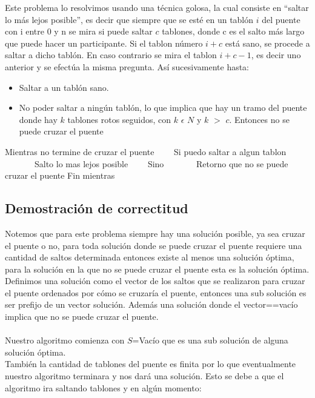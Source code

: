 Este problema lo resolvimos usando una técnica golosa, la cual consiste en “saltar lo más lejos posible”, es decir que siempre que se esté en un tablón $i$ del puente con i entre 0 y n se mira si puede saltar $c$ tablones, donde c es el salto más largo que puede hacer un participante. Si el tablon número $i + c$ está sano, se procede a saltar a dicho tablón. En caso contrario se mira el tablon $i + c - 1$, es decir uno anterior y se efectúa la misma pregunta. Así sucesivamente hasta:

\begin{itemize}
	\item Saltar a un tablón sano.
	\item No poder saltar a ningún tablón, lo que implica que hay un tramo del puente donde hay $k$ tablones rotos seguidos, con $k$  $\epsilon$ $N$ y $k$ $>$ $c$. Entonces no se puede cruzar el puente
\end{itemize}

\begin{codebox}
\li Mientras no termine de cruzar el puente
\li \ \ \ \ Si puedo saltar a algun tablon
\li \ \ \ \ \ \ \ Salto lo mas lejos posible
\li \ \ \ \ Sino
\li \ \ \ \ \ \ \ Retorno que no se puede cruzar el puente
\li Fin mientras 
\end{codebox}




\subsection{Demostraci\'on de correctitud} 

Notemos que para este problema siempre hay una solución posible, ya sea cruzar el puente o no, para toda solución donde se puede cruzar el puente requiere una cantidad de saltos determinada entonces existe al menos una solución óptima, para la solución en la que no se puede cruzar el puente esta es la solución óptima. \\
Definimos  una solución como el vector de los saltos que se realizaron para cruzar el puente ordenados por cómo se cruzaría el puente, entonces una sub solución es ser prefijo de un vector solución. Además una solución donde el vector==vacío implica que no se puede cruzar el puente. \\ \\

Nuestro algoritmo comienza con $S$=Vacío que es una sub solución de alguna solución óptima. \\
También la cantidad de tablones del puente es finita por lo que eventualmente nuestro algoritmo terminara y nos dará una solución. Esto se debe a que el algoritmo ira saltando tablones y en algún momento:

